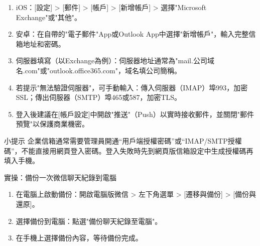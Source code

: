 \begin{enumerate}
  \item iOS：[設定] > [郵件] > [帳戶] > [新增帳戶] > 選擇"Microsoft Exchange"或"其他"。
  \item 安卓：在自帶的"電子郵件"App或Outlook App中選擇"新增帳戶"，輸入完整信箱地址和密碼。
  \item 伺服器填寫（以Exchange為例）：伺服器地址通常為"mail.公司域名.com"或"outlook.office365.com"，域名填公司簡稱。
  \item 若提示"無法驗證伺服器"，可手動輸入：傳入伺服器（IMAP）埠993，加密SSL；傳出伺服器（SMTP）埠465或587，加密TLS。
  \item 登入後建議在[帳戶設定]中開啟"推送"（Push）以實時接收郵件，並關閉"郵件預覽"以保護商業機密。
\end{enumerate}

\begin{tcbinfo}{小提示}
企業信箱通常需要管理員開通“用戶端授權密碼”或“IMAP/SMTP授權碼”，不能直接用網頁登入密碼。登入失敗時先到網頁版信箱設定中生成授權碼再填入手機。

\end{tcbinfo}

\begin{tcbpractice}{實操：備份一次微信聊天紀錄到電腦}
\begin{enumerate}
  \item 在電腦上啟動備份：開啟電腦版微信 > 左下角選單 > [遷移與備份] > [備份與還原]。
  \item 選擇備份到電腦：點選"備份聊天紀錄至電腦"。
  \item 在手機上選擇備份內容，等待備份完成。
\end{enumerate}

\end{tcbpractice}
